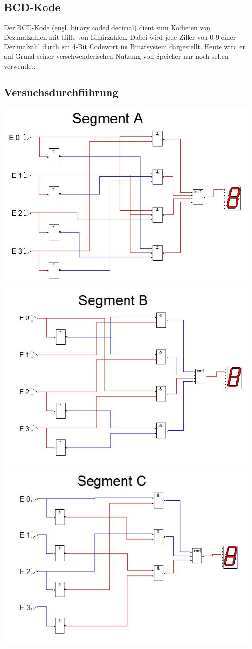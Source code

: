 \documentclass[a4paper, 11pt, fleqn, DIV=10, twoside, BCOR=10mm]{scrreprt}
\begin{document}
\section{BCD-Kode}
Der BCD-Kode (engl. binary coded decimal) dient zum Kodieren von Dezimalzahlen mit Hilfe von Binärzahlen. Dabei wird jede Ziffer von 0-9 einer Dezimalzahl durch ein 4-Bit Codewort im Binärsystem dargestellt. Heute wird er auf Grund seiner verschwenderischen Nutzung von Speicher nur noch selten verwendet.
\newpage
\begin{center}
\chapter{Versuchsdurchführung}
\includegraphics[width=0.75\columnwidth]{DT4Graphics/Segment_A.jpg}
\vspace{10mm}
\includegraphics[width=0.75\columnwidth]{DT4Graphics/Segment_B.jpg}
\includegraphics[width=0.75\columnwidth]{DT4Graphics/Segment_C.jpg}

\end{center}
\end{document}
